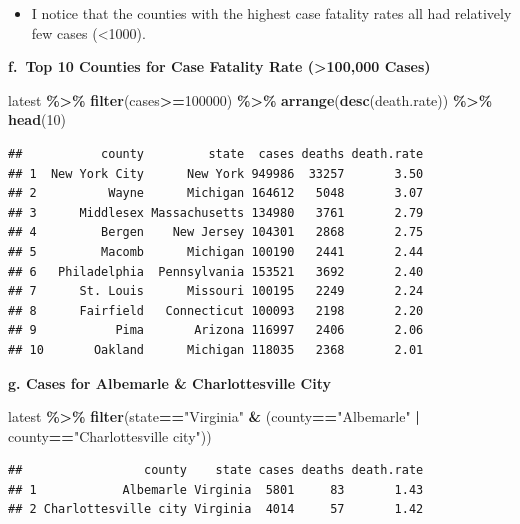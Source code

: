 \documentclass[
  openany]{book}
\newenvironment{Shaded}{\begin{snugshade}}{\end{snugshade}}
\newcommand{\DecValTok}[1]{\textcolor[rgb]{0.00,0.00,0.81}{#1}}
\newcommand{\FunctionTok}[1]{\textcolor[rgb]{0.13,0.29,0.53}{\textbf{#1}}}
\newcommand{\NormalTok}[1]{#1}
\newcommand{\SpecialCharTok}[1]{\textcolor[rgb]{0.81,0.36,0.00}{\textbf{#1}}}
\newcommand{\StringTok}[1]{\textcolor[rgb]{0.31,0.60,0.02}{#1}}
\providecommand{\tightlist}{%
  \setlength{\itemsep}{0pt}\setlength{\parskip}{0pt}}
\begin{document}
\begin{itemize}
\tightlist
\item
  I notice that the counties with the highest case fatality rates all had relatively few cases (\textless1000).
\end{itemize}

\textbf{f.~Top 10 Counties for Case Fatality Rate (\textgreater100,000 Cases)}

\begin{Shaded}
\begin{Highlighting}[]
\NormalTok{latest }\SpecialCharTok{\%\textgreater{}\%} 
  \FunctionTok{filter}\NormalTok{(cases}\SpecialCharTok{\textgreater{}=}\DecValTok{100000}\NormalTok{) }\SpecialCharTok{\%\textgreater{}\%} 
  \FunctionTok{arrange}\NormalTok{(}\FunctionTok{desc}\NormalTok{(death.rate)) }\SpecialCharTok{\%\textgreater{}\%} 
  \FunctionTok{head}\NormalTok{(}\DecValTok{10}\NormalTok{)}
\end{Highlighting}
\end{Shaded}

\begin{verbatim}
##           county         state  cases deaths death.rate
## 1  New York City      New York 949986  33257       3.50
## 2          Wayne      Michigan 164612   5048       3.07
## 3      Middlesex Massachusetts 134980   3761       2.79
## 4         Bergen    New Jersey 104301   2868       2.75
## 5         Macomb      Michigan 100190   2441       2.44
## 6   Philadelphia  Pennsylvania 153521   3692       2.40
## 7      St. Louis      Missouri 100195   2249       2.24
## 8      Fairfield   Connecticut 100093   2198       2.20
## 9           Pima       Arizona 116997   2406       2.06
## 10       Oakland      Michigan 118035   2368       2.01
\end{verbatim}

\textbf{g. Cases for Albemarle \& Charlottesville City}

\begin{Shaded}
\begin{Highlighting}[]
\NormalTok{latest }\SpecialCharTok{\%\textgreater{}\%} 
  \FunctionTok{filter}\NormalTok{(state}\SpecialCharTok{==}\StringTok{"Virginia"} \SpecialCharTok{\&}\NormalTok{ (county}\SpecialCharTok{==}\StringTok{"Albemarle"} \SpecialCharTok{|}\NormalTok{ county}\SpecialCharTok{==}\StringTok{"Charlottesville city"}\NormalTok{))}
\end{Highlighting}
\end{Shaded}

\begin{verbatim}
##                 county    state cases deaths death.rate
## 1            Albemarle Virginia  5801     83       1.43
## 2 Charlottesville city Virginia  4014     57       1.42
\end{verbatim}
\end{document}
